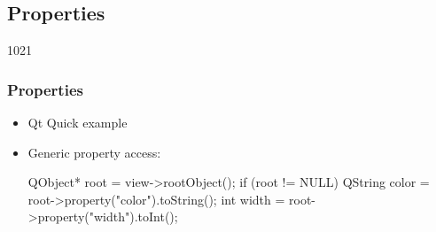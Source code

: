 %
%
%
%

\subsection{Properties}

\begin{slide}[fragile]{1021}
\frametitle{Properties}
\begin{itemize}
\item Qt Quick example\\[2mm]


\item Generic property access:\\
\begin{cpp}
QObject* root = view->rootObject();
if (root != NULL) {
    QString color = root->property("color").toString();
    int     width = root->property("width").toInt();
}
\end{cpp}
\end{itemize}
\end{slide}

